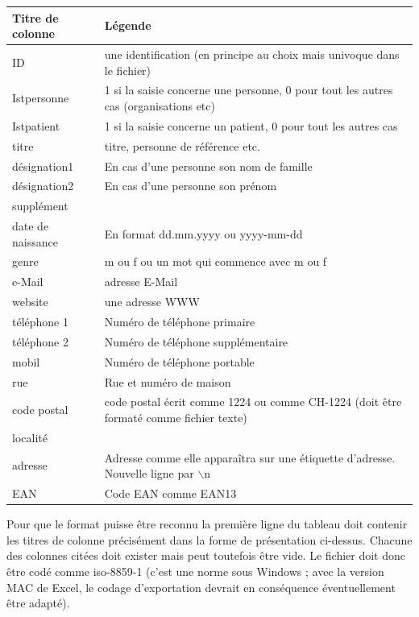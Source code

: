 \begin{tabular}[h]{|l|l|}
\hline Titre de colonne & Légende\\
\hline
\hline  ID & une identification (en principe au choix mais univoque dans le fichier)\\
\hline Istpersonne & 1 si la saisie concerne une personne, 0 pour tout les autres cas (organisations etc)\\
\hline Istpatient & 1 si la saisie concerne un patient, 0 pour tout les autres cas\\
\hline titre & titre, personne de référence etc.\\
\hline désignation1 & En cas d'une personne son nom de famille\\
\hline désignation2 & En cas d'une personne son prénom\\
\hline supplément & \\
\hline date de naissance & En format dd.mm.yyyy ou yyyy-mm-dd\\
\hline genre & m ou f ou un mot qui commence avec m ou f\\
\hline e-Mail & adresse E-Mail\\
\hline website & une adresse WWW\\
\hline téléphone 1 & Numéro de téléphone primaire\\
\hline téléphone 2 & Numéro de téléphone supplémentaire\\
\hline mobil & Numéro de téléphone portable\\
\hline rue & Rue et numéro de maison\\
\hline code postal & code postal écrit comme 1224 ou comme CH-1224 (doit être formaté comme fichier texte)\\
\hline localité & \\
\hline adresse & Adresse comme elle apparaîtra sur une étiquette d'adresse. Nouvelle ligne par $\backslash$n\\
\hline EAN & Code EAN comme EAN13\\
\hline
\end{tabular}

\medskip

Pour que le format puisse être reconnu la première ligne du tableau doit contenir les titres de colonne précisément dans la forme de présentation ci-dessus. Chacune des colonnes citées doit exister mais peut toutefois être vide. Le fichier doit donc être codé comme iso-8859-1 (c'est une norme sous Windows ; avec la version MAC de Excel, le codage d'exportation devrait en conséquence éventuellement être adapté).


